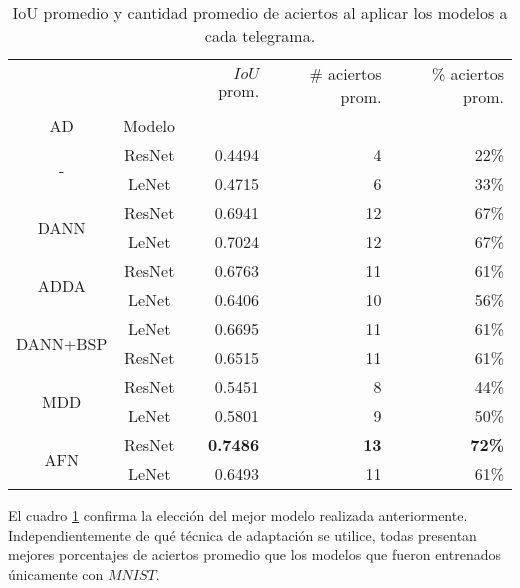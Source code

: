\begin{table}[H]
    \centering
    \begin{tabular}{cc|rrr}
        \toprule
                                     &        & $IoU$ prom.     & \# aciertos prom. & \% aciertos prom. \\
        AD                           & Modelo &                 &                   &                   \\
        \midrule
        \multirow[c]{2}{*}{-}        & ResNet & 0.4494          & 4                 & 22\%              \\
                                     & LeNet  & 0.4715          & 6                 & 33\%              \\\hline
        \multirow[c]{2}{*}{DANN}     & ResNet & 0.6941          & 12                & 67\%              \\
                                     & LeNet  & 0.7024          & 12                & 67\%              \\\hline
        \multirow[c]{2}{*}{ADDA}     & ResNet & 0.6763          & 11                & 61\%              \\
                                     & LeNet  & 0.6406          & 10                & 56\%              \\\hline
        \multirow[c]{2}{*}{DANN+BSP} & LeNet  & 0.6695          & 11                & 61\%              \\
                                     & ResNet & 0.6515          & 11                & 61\%              \\\hline
        \multirow[c]{2}{*}{MDD}      & ResNet & 0.5451          & 8                 & 44\%              \\
                                     & LeNet  & 0.5801          & 9                 & 50\%              \\\hline
        \multirow[c]{2}{*}{AFN}      & ResNet & \textbf{0.7486} & \textbf{13}       & \textbf{72\%}     \\
                                     & LeNet  & 0.6493          & 11                & 61\%              \\
        \bottomrule
    \end{tabular}
    \caption{IoU promedio y cantidad promedio de aciertos al aplicar los modelos a cada telegrama.}
    \label{tab:iou-cant-aciertos-en-telegramas}
\end{table}

El cuadro \ref{tab:iou-cant-aciertos-en-telegramas} confirma la elecci\'on del mejor modelo realizada anteriormente.
Independientemente de qu\'e t\'ecnica de adaptaci\'on se utilice, todas presentan mejores porcentajes de aciertos
promedio que los modelos que fueron entrenados \'unicamente con $MNIST$.

